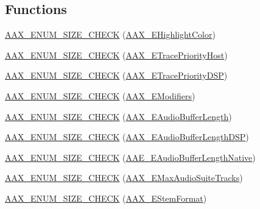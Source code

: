 \subsection*{Functions}
\begin{DoxyCompactItemize}
\item 
\mbox{\hyperlink{a00491_aa804ea73d26c782b262ab44521f221be}{A\+A\+X\+\_\+\+E\+N\+U\+M\+\_\+\+S\+I\+Z\+E\+\_\+\+C\+H\+E\+CK}} (\mbox{\hyperlink{a00491_a143056a07989a48e5db3a101f1b12567}{A\+A\+X\+\_\+\+E\+Highlight\+Color}})
\item 
\mbox{\hyperlink{a00491_aedc60d38ce267f07f0400acac7a19a6f}{A\+A\+X\+\_\+\+E\+N\+U\+M\+\_\+\+S\+I\+Z\+E\+\_\+\+C\+H\+E\+CK}} (\mbox{\hyperlink{a00491_a2dd667e4dea5781f38832fd9f1725f1b}{A\+A\+X\+\_\+\+E\+Trace\+Priority\+Host}})
\item 
\mbox{\hyperlink{a00491_a3bd6010dea2dc5068463159871e3f69d}{A\+A\+X\+\_\+\+E\+N\+U\+M\+\_\+\+S\+I\+Z\+E\+\_\+\+C\+H\+E\+CK}} (\mbox{\hyperlink{a00491_ac564db2d51bc55990fb37ab02062346c}{A\+A\+X\+\_\+\+E\+Trace\+Priority\+D\+SP}})
\item 
\mbox{\hyperlink{a00491_a3383a38a91fa5321820b04e86c444a0e}{A\+A\+X\+\_\+\+E\+N\+U\+M\+\_\+\+S\+I\+Z\+E\+\_\+\+C\+H\+E\+CK}} (\mbox{\hyperlink{a00491_a47756e0a56d00468b7045eb26500cb78}{A\+A\+X\+\_\+\+E\+Modifiers}})
\item 
\mbox{\hyperlink{a00491_ac3eb97829e14e794da3579961b62a104}{A\+A\+X\+\_\+\+E\+N\+U\+M\+\_\+\+S\+I\+Z\+E\+\_\+\+C\+H\+E\+CK}} (\mbox{\hyperlink{a00491_ada5e011bdfdc6a996de752662b3dfbe7}{A\+A\+X\+\_\+\+E\+Audio\+Buffer\+Length}})
\item 
\mbox{\hyperlink{a00491_a48bf8941ced9fee5fcd741e21249ad6a}{A\+A\+X\+\_\+\+E\+N\+U\+M\+\_\+\+S\+I\+Z\+E\+\_\+\+C\+H\+E\+CK}} (\mbox{\hyperlink{a00491_ab33e0f1ecf04ca4161fa8d8de5845d67}{A\+A\+X\+\_\+\+E\+Audio\+Buffer\+Length\+D\+SP}})
\item 
\mbox{\hyperlink{a00491_ab9f66e624033efd4206cada3c3df897c}{A\+A\+X\+\_\+\+E\+N\+U\+M\+\_\+\+S\+I\+Z\+E\+\_\+\+C\+H\+E\+CK}} (\mbox{\hyperlink{a00491_aa1769ee466fd07659d8c7ef5ac61cd49}{A\+A\+E\+\_\+\+E\+Audio\+Buffer\+Length\+Native}})
\item 
\mbox{\hyperlink{a00491_a33eb853a54e3b198df70fc4586aaf145}{A\+A\+X\+\_\+\+E\+N\+U\+M\+\_\+\+S\+I\+Z\+E\+\_\+\+C\+H\+E\+CK}} (\mbox{\hyperlink{a00491_af94bcc724bc9a54eb8a83a664c0b1b48}{A\+A\+X\+\_\+\+E\+Max\+Audio\+Suite\+Tracks}})
\item 
\mbox{\hyperlink{a00491_a9c68c20c5e598eafcebd9046f5160164}{A\+A\+X\+\_\+\+E\+N\+U\+M\+\_\+\+S\+I\+Z\+E\+\_\+\+C\+H\+E\+CK}} (\mbox{\hyperlink{a00491_ad8af5ef008b2bd478add9a0acb0a1d85}{A\+A\+X\+\_\+\+E\+Stem\+Format}})

\end{DoxyCompactItemize}
